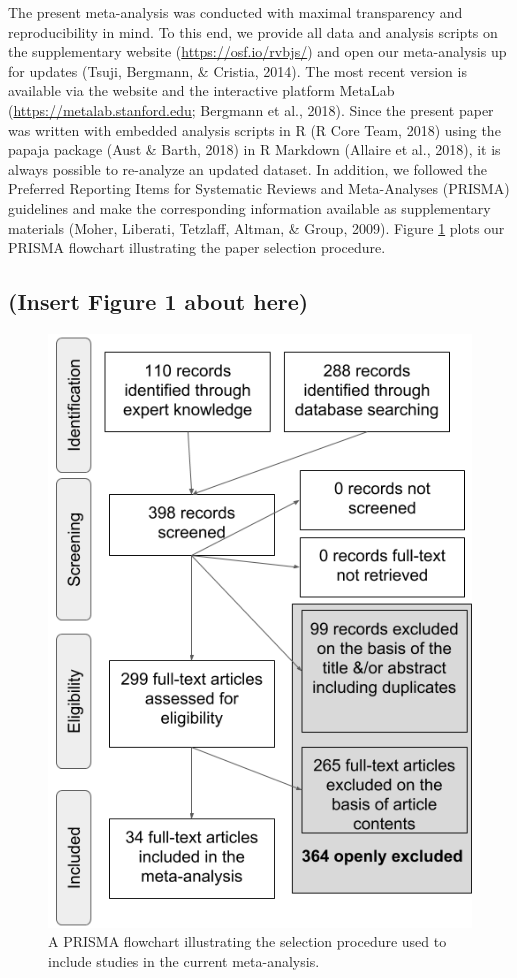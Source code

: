 \documentclass[man]{apa6}
\begin{document}
The present meta-analysis was conducted with maximal transparency and reproducibility in mind. To this end, we provide all data and analysis scripts on the supplementary website (\url{https://osf.io/rvbjs/}) and open our meta-analysis up for updates (Tsuji, Bergmann, \& Cristia, 2014). The most recent version is available via the website and the interactive platform MetaLab (\url{https://metalab.stanford.edu}; Bergmann et al., 2018). Since the present paper was written with embedded analysis scripts in R (R Core Team, 2018) using the papaja package (Aust \& Barth, 2018) in R Markdown (Allaire et al., 2018), it is always possible to re-analyze an updated dataset. In addition, we followed the Preferred Reporting Items for Systematic Reviews and Meta-Analyses (PRISMA) guidelines and make the corresponding information available as supplementary materials (Moher, Liberati, Tetzlaff, Altman, \& Group, 2009). Figure \ref{fig:PRISMA-image} plots our PRISMA flowchart illustrating the paper selection procedure.

\hypertarget{insert-figure-1-about-here}{%
\subsection{(Insert Figure 1 about here)}\label{insert-figure-1-about-here}}

\begin{figure}
\centering
\includegraphics{figures/Figure_1_PRISMA_MA_Mispronunciation.png}
\caption{\label{fig:PRISMA-image}A PRISMA flowchart illustrating the selection procedure used to include studies in the current meta-analysis.}
\end{figure}
\end{document}
